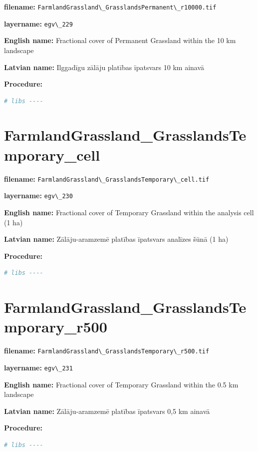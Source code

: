 \documentclass[
]{book}
\newcommand{\passthrough}[1]{#1}
\begin{document}
\textbf{filename:} \passthrough{\lstinline!FarmlandGrassland\_GrasslandsPermanent\_r10000.tif!}

\textbf{layername:} \passthrough{\lstinline!egv\_229!}

\textbf{English name:} Fractional cover of Permanent Grassland within the 10 km landscape

\textbf{Latvian name:} Ilggadīgu zālāju platības īpatsvars 10 km ainavā

\textbf{Procedure:}

\begin{lstlisting}[language=R]
# libs ----
\end{lstlisting}

\section{FarmlandGrassland\_GrasslandsTemporary\_cell}\label{ch06.230}

\textbf{filename:} \passthrough{\lstinline!FarmlandGrassland\_GrasslandsTemporary\_cell.tif!}

\textbf{layername:} \passthrough{\lstinline!egv\_230!}

\textbf{English name:} Fractional cover of Temporary Grassland within the analysis cell (1 ha)

\textbf{Latvian name:} Zālāju-aramzemē platības īpatsvars analīzes šūnā (1 ha)

\textbf{Procedure:}

\begin{lstlisting}[language=R]
# libs ----
\end{lstlisting}

\section{FarmlandGrassland\_GrasslandsTemporary\_r500}\label{ch06.231}

\textbf{filename:} \passthrough{\lstinline!FarmlandGrassland\_GrasslandsTemporary\_r500.tif!}

\textbf{layername:} \passthrough{\lstinline!egv\_231!}

\textbf{English name:} Fractional cover of Temporary Grassland within the 0.5 km landscape

\textbf{Latvian name:} Zālāju-aramzemē platības īpatsvars 0,5 km ainavā

\textbf{Procedure:}

\begin{lstlisting}[language=R]
# libs ----
\end{lstlisting}
\end{document}

